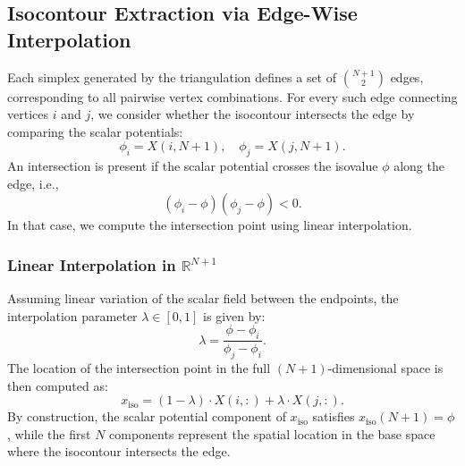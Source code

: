 \subsection{Isocontour Extraction via Edge-Wise Interpolation}
Each simplex generated by the triangulation defines a set of \( \binom{N+1}{2} \) edges, corresponding to all pairwise vertex combinations. For every such edge connecting vertices \( i \) and \( j \), we consider whether the isocontour intersects the edge by comparing the scalar potentials:
\begin{equation}
\phi_i = X(i, N+1), \quad \phi_j = X(j, N+1).
\end{equation}
An intersection is present if the scalar potential crosses the isovalue \( \phi \) along the edge, i.e.,
\begin{equation}
(\phi_i - \phi)(\phi_j - \phi) < 0.
\end{equation}
In that case, we compute the intersection point using linear interpolation.

\subsubsection*{Linear Interpolation in \texorpdfstring{\( \mathbb{R}^{N+1} \)}{R\^(N+1)}}
Assuming linear variation of the scalar field between the endpoints, the interpolation parameter \( \lambda \in [0,1] \) is given by:
\begin{equation}
\lambda = \frac{\phi - \phi_i}{\phi_j - \phi_i}.
\end{equation}
The location of the intersection point in the full \((N+1)\)-dimensional space is then computed as:
\begin{equation}
x_{\text{iso}} = (1 - \lambda) \cdot X(i,:) + \lambda \cdot X(j,:).
\end{equation}
By construction, the scalar potential component of \( x_{\text{iso}} \) satisfies \( x_{\text{iso}}(N+1) = \phi \), while the first \( N \) components represent the spatial location in the base space where the isocontour intersects the edge.
